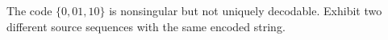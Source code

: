 \begin{yourturn}
The code $\{0,01,10\}$ is nonsingular but not uniquely decodable. Exhibit two
different source sequences with the same encoded string.
\ifshowanswers\else\workspace[1]\fi
{}
\end{yourturn}

\vspace{1.2cm}
